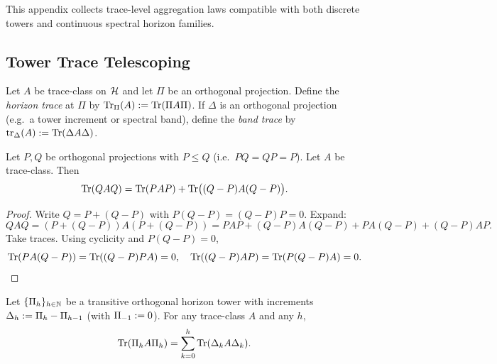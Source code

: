 \label{sec:trace-level-laws}

This appendix collects trace-level aggregation laws compatible with both
discrete towers and continuous spectral horizon families.

\subsection{Tower Trace Telescoping}
\label{subsec:trace-level-tower}

\begin{definition}
\label{def:horizon-trace-band-trace}
Let $A$ be trace-class on $\mathcal{H}$ and let $\Pi$ be an orthogonal projection.
Define the \emph{horizon trace} at $\Pi$ by $\mathrm{Tr}_{\Pi}(A):=\mathrm{Tr}(\Pi A\Pi)$.
If $\Delta$ is an orthogonal projection (e.g.\ a tower increment or spectral band), define the \emph{band trace} by $\mathrm{tr}_\Delta(A):=\mathrm{Tr}(\Delta A\Delta)$.
\end{definition}

\begin{lemma}
\label{lem:two-level-trace-splitting}
Let $P,Q$ be orthogonal projections with $P\le Q$ (i.e.\ $PQ=QP=P$). Let $A$ be trace-class.
Then
\[
\mathrm{Tr}(Q A Q) = \mathrm{Tr}(P A P) + \mathrm{Tr}\big((Q-P)A(Q-P)\big).
\]
\end{lemma}

\begin{proof}
Write $Q=P+(Q-P)$ with $P(Q-P)=(Q-P)P=0$.
Expand:
\[
QAQ = (P+(Q-P))A(P+(Q-P))
= PAP + (Q-P)A(Q-P) + PA(Q-P) + (Q-P)AP.
\]
Take traces. Using cyclicity and $P(Q-P)=0$,
\[
\mathrm{Tr}(PA(Q-P)) = \mathrm{Tr}((Q-P)PA)=0,\quad
\mathrm{Tr}((Q-P)AP)=\mathrm{Tr}(P(Q-P)A)=0.
\]
\end{proof}

\begin{theorem}
\label{thm:trace-telescoping-tower}
Let $\{\Pi_{h}\}_{h\in\mathbb{N}}$ be a transitive orthogonal horizon tower with increments $\Delta_{h}:=\Pi_{h}-\Pi_{h-1}$ (with $\Pi_{-1}:=0$).
For any trace-class $A$ and any $h$,
\[
\mathrm{Tr}(\Pi_{h} A\Pi_{h})=\sum_{k=0}^{h}\mathrm{Tr}(\Delta_{k} A\Delta_{k}).
\]
\end{theorem}

